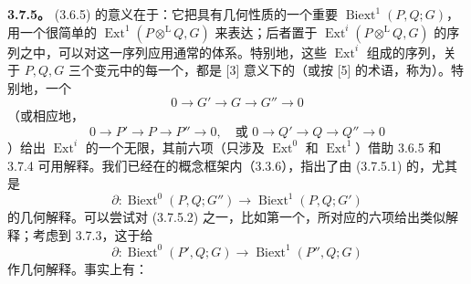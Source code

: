 \textbf{3.7.5。}  (3.6.5) 的意义在于：它把具有几何性质的一个重要 $\operatorname{Biext}^1(P,Q;G)$，用一个很简单的 $\operatorname{Ext}^1(P\mathbin{\otimes^{\mathrm L}}Q,G)$ 来表达；后者置于 $\operatorname{Ext}^i(P\mathbin{\otimes^{\mathrm L}}Q,G)$ 的序列之中，可以对这一序列应用通常的体系。特别地，这些 $\operatorname{Ext}^i$ 组成的序列，关于 $P,Q,G$ 三个变元中的每一个，都是 [3] 意义下的（或按 [5] 的术语，称为）。特别地，一个
\[
0\longrightarrow G'\longrightarrow G\longrightarrow G''\longrightarrow0\tag{3.7.5.1}
\]
（或相应地，
\[
0\longrightarrow P'\longrightarrow P\longrightarrow P''\longrightarrow0,
\quad\text{或 }0\longrightarrow Q'\longrightarrow Q\longrightarrow Q''\longrightarrow0\tag{3.7.5.2}
\]
）给出 $\operatorname{Ext}^i$ 的一个无限，其前六项（只涉及 $\operatorname{Ext}^0$ 和 $\operatorname{Ext}^1$）借助 3.6.5 和 3.7.4 可用解释。我们已经在的概念框架内（3.3.6），指出了由 (3.7.5.1) 的，尤其是
\[
\partial:\operatorname{Biext}^0(P,Q;G'')\longrightarrow\operatorname{Biext}^1(P,Q;G')\tag{3.7.5.3}
\]
的几何解释。可以尝试对 (3.7.5.2) 之一，比如第一个，所对应的六项给出类似解释；考虑到 3.7.3，这于给
\[
\partial:\operatorname{Biext}^0(P',Q;G)\longrightarrow\operatorname{Biext}^1(P'',Q;G)\tag{3.7.5.4}
\]
作几何解释。事实上有：

